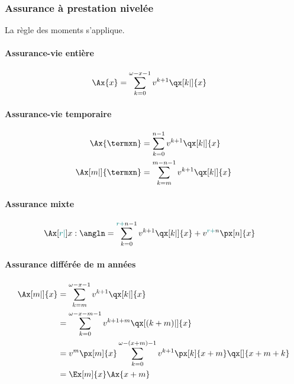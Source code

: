 \documentclass[10pt, french]{article}
\begin{document}
\begin{multicols*}{3}
\subsubsection*{\textcolor{amber(sae/ece)}{Assurance à prestation nivelée}}

La règle des moments s'applique.

\paragraph{Assurance-vie entière} 

\begin{align*}
\Ax{x}	&= \sum_{k=0}^{\omega - x - 1} v^{k+1} \qx[k|]{x} 
\end{align*}

\paragraph{Assurance-vie temporaire}

\begin{align*}
\Ax{\termxn}		&= \sum_{k=0}^{n-1} v^{k+1} \qx[k|]{x}			\\
\Ax[m|]{\termxn}	&= \sum_{k=m}^{m - n -1} v^{k + 1} \qx[k|]{x} 	
\end{align*}

\paragraph{Assurance mixte}

\begin{align*}
\Ax[{\color{teal}{r|}}]{x:\angln}
	&= \sum_{k=0}^{{\color{teal}{r} + }n-1} v^{k+1} \qx[k|]{x} + v^{{\color{teal}{r} +}n} \px[n]{x}
\end{align*}

\paragraph{Assurance différée de m années}

\begin{align*}
\Ax[m|]{x}	
	&= \sum_{k=m}^{\omega - x -1} v^{k+1} \qx[k|]{x} \\
	&= \sum_{k=0}^{\omega - x - m - 1} v^{k+1+m} \qx[(k+m)|]{x} \\
	&= v^m \px[m]{x} \sum_{k=0}^{\omega - (x+m) - 1} v^{k+1} \px[k]{x+m} \qx[]{x+m+k} \\
	&= \Ex[m]{x} \Ax{x+m} 
\end{align*}


\end{multicols*}
\end{document}
